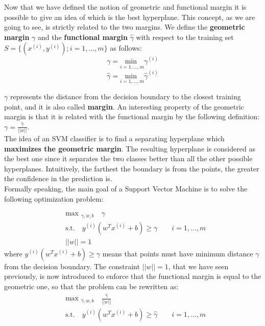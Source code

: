 Now that we have defined the notion of geometric and functional margin it is possible to give an idea of which is the best hyperplane. This concept, as we are going to see, is strictly related to the two margins. We define the \textbf{geometric margin} $\gamma$ and the \textbf{functional margin} $\hat{\gamma}$ with respect to the training set $S = \{(x^{(i)},y^{(i)}); i = 1,\dots,m \}$ as follows:
$$\gamma = \underset{i = 1,\dots,m}{\text{min }}\gamma^{(i)}$$
$$\hat{\gamma} = \underset{i = 1,\dots,m}{\text{min }}\hat{\gamma}^{(i)}$$


$\gamma$ represents the distance from the decision boundary to the closest training point, and it is also called \textbf{margin}. An interesting property of the geometric margin is that it is related with the functional margin by the following definition: $\gamma = \frac{\hat{\gamma}}{||w||}$. \\
The idea of an SVM classifier is to find a separating hyperplane which \textbf{maximizes the geometric margin}. The resulting hyperplane is considered as the best one since it separates the two classes better than all the other possible hyperplanes. Intuitively, the farthest the boundary is from the points, the greater the confidence in the prediction is.\\
Formally speaking, the main goal of a Support Vector Machine is to solve the following optimization problem:

\begin{equation*}
\begin{aligned}
&\text{max }_{\gamma,w,b} \quad \gamma\\
&\text{s.t.} \quad y^{(i)}(w^Tx^{(i)}+b) \geq \gamma \qquad i = 1,\dots, m\\
&||w|| = 1
\end{aligned}
\end{equation*}
where $y^{(i)}(w^Tx^{(i)}+b) \geq \gamma$ means that points must have minimum distance $\gamma$ from the decision boundary.
The constraint $||w|| = 1$, that we have seen previously, is now introduced to enforce that the functional margin is equal to the geometric one, so that the problem can be rewritten as:
\begin{equation*}
\begin{aligned}
&\text{max }_{\hat{\gamma},w,b} \quad \frac{\hat{\gamma}}{||w||}\\
&\text{s.t.} \quad y^{(i)}(w^Tx^{(i)}+b) \geq \hat{\gamma} \qquad i = 1,\dots, m\\
\end{aligned}
\end{equation*}

